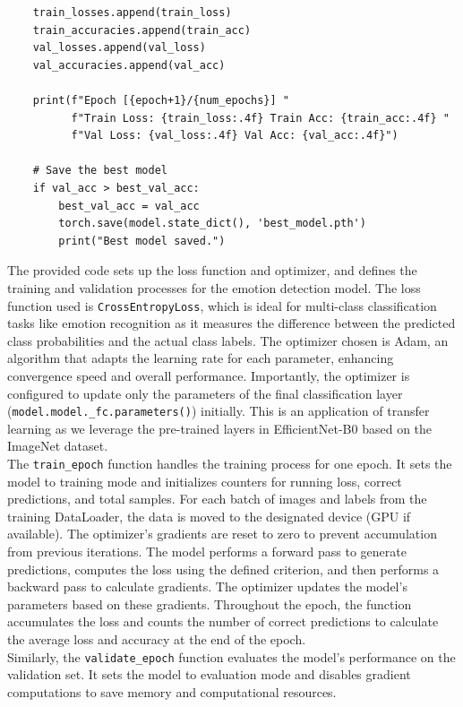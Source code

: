 \documentclass{article}
\begin{document}
\begin{verbatim}
    train_losses.append(train_loss)
    train_accuracies.append(train_acc)
    val_losses.append(val_loss)
    val_accuracies.append(val_acc)

    print(f"Epoch [{epoch+1}/{num_epochs}] "
          f"Train Loss: {train_loss:.4f} Train Acc: {train_acc:.4f} "
          f"Val Loss: {val_loss:.4f} Val Acc: {val_acc:.4f}")

    # Save the best model
    if val_acc > best_val_acc:
        best_val_acc = val_acc
        torch.save(model.state_dict(), 'best_model.pth')
        print("Best model saved.")
\end{verbatim}

The provided code sets up the loss function and optimizer, and defines the training and validation processes for the emotion detection model. 
The loss function used is \texttt{CrossEntropyLoss}, which is ideal for multi-class classification tasks like emotion recognition as it measures the difference between the predicted class probabilities and the actual class labels.
The optimizer chosen is Adam, an algorithm that adapts the learning rate for each parameter, enhancing convergence speed and overall performance. 
Importantly, the optimizer is configured to update only the parameters of the final classification layer (\texttt{model.model.\_fc.parameters()}) initially. 
This is an application of transfer learning as we leverage the pre-trained layers in EfficientNet-B0 based on the ImageNet dataset.
\\
The \texttt{train\_epoch} function handles the training process for one epoch. It sets the model to training mode and initializes counters for running loss, correct predictions, and total samples. 
For each batch of images and labels from the training DataLoader, the data is moved to the designated device (GPU if available). 
The optimizer's gradients are reset to zero to prevent accumulation from previous iterations. 
The model performs a forward pass to generate predictions, computes the loss using the defined criterion, and then performs a backward pass to calculate gradients. 
The optimizer updates the model's parameters based on these gradients. Throughout the epoch, the function accumulates the loss and counts the number of correct predictions to calculate the average loss and accuracy at the end of the epoch.
\\
Similarly, the \texttt{validate\_epoch} function evaluates the model's performance on the validation set. 
It sets the model to evaluation mode and disables gradient computations to save memory and computational resources. 
\end{document}
